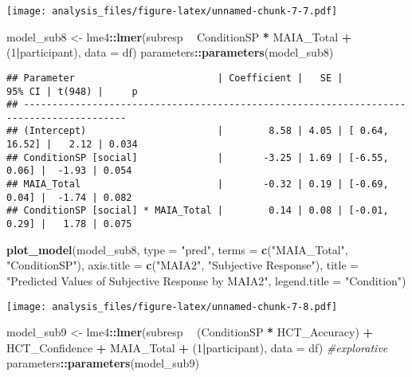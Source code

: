 \documentclass[
]{article}
\newenvironment{Shaded}{\begin{snugshade}}{\end{snugshade}}
\newcommand{\CommentTok}[1]{\textcolor[rgb]{0.56,0.35,0.01}{\textit{#1}}}
\newcommand{\DataTypeTok}[1]{\textcolor[rgb]{0.13,0.29,0.53}{#1}}
\newcommand{\DecValTok}[1]{\textcolor[rgb]{0.00,0.00,0.81}{#1}}
\newcommand{\KeywordTok}[1]{\textcolor[rgb]{0.13,0.29,0.53}{\textbf{#1}}}
\newcommand{\NormalTok}[1]{#1}
\newcommand{\OperatorTok}[1]{\textcolor[rgb]{0.81,0.36,0.00}{\textbf{#1}}}
\newcommand{\StringTok}[1]{\textcolor[rgb]{0.31,0.60,0.02}{#1}}
\begin{document}
\texttt{[image: analysis\_files/figure-latex/unnamed-chunk-7-7.pdf]}

\begin{Shaded}
\begin{Highlighting}[]
\NormalTok{model_sub8 <-}\StringTok{ }\NormalTok{lme4}\OperatorTok{::}\KeywordTok{lmer}\NormalTok{(subresp }\OperatorTok{~}\StringTok{ }\NormalTok{ConditionSP }\OperatorTok{*}\StringTok{ }\NormalTok{MAIA_Total }\OperatorTok{+}\StringTok{ }\NormalTok{(}\DecValTok{1}\OperatorTok{|}\NormalTok{participant), }\DataTypeTok{data =}\NormalTok{ df)}
\NormalTok{parameters}\OperatorTok{::}\KeywordTok{parameters}\NormalTok{(model_sub8)}
\end{Highlighting}
\end{Shaded}

\begin{verbatim}
## Parameter                         | Coefficient |   SE |         95% CI | t(948) |     p
## ----------------------------------------------------------------------------------------
## (Intercept)                       |        8.58 | 4.05 | [ 0.64, 16.52] |   2.12 | 0.034
## ConditionSP [social]              |       -3.25 | 1.69 | [-6.55,  0.06] |  -1.93 | 0.054
## MAIA_Total                        |       -0.32 | 0.19 | [-0.69,  0.04] |  -1.74 | 0.082
## ConditionSP [social] * MAIA_Total |        0.14 | 0.08 | [-0.01,  0.29] |   1.78 | 0.075
\end{verbatim}

\begin{Shaded}
\begin{Highlighting}[]
\KeywordTok{plot_model}\NormalTok{(model_sub8, }\DataTypeTok{type =} \StringTok{"pred"}\NormalTok{, }\DataTypeTok{terms =} \KeywordTok{c}\NormalTok{(}\StringTok{"MAIA_Total"}\NormalTok{, }\StringTok{"ConditionSP"}\NormalTok{), }\DataTypeTok{axis.title =} \KeywordTok{c}\NormalTok{(}\StringTok{"MAIA2"}\NormalTok{, }\StringTok{"Subjective Response"}\NormalTok{), }\DataTypeTok{title =} \StringTok{"Predicted Values of Subjective Response by MAIA2"}\NormalTok{, }\DataTypeTok{legend.title =} \StringTok{"Condition"}\NormalTok{)}
\end{Highlighting}
\end{Shaded}

\texttt{[image: analysis\_files/figure-latex/unnamed-chunk-7-8.pdf]}

\begin{Shaded}
\begin{Highlighting}[]
\NormalTok{model_sub9 <-}\StringTok{ }\NormalTok{lme4}\OperatorTok{::}\KeywordTok{lmer}\NormalTok{(subresp }\OperatorTok{~}\StringTok{ }\NormalTok{(ConditionSP }\OperatorTok{*}\StringTok{ }\NormalTok{HCT_Accuracy) }\OperatorTok{+}\StringTok{ }\NormalTok{HCT_Confidence }\OperatorTok{+}\StringTok{ }\NormalTok{MAIA_Total }\OperatorTok{+}\StringTok{ }\NormalTok{(}\DecValTok{1}\OperatorTok{|}\NormalTok{participant), }\DataTypeTok{data =}\NormalTok{ df)                                                                                       }\CommentTok{#explorative}
\NormalTok{parameters}\OperatorTok{::}\KeywordTok{parameters}\NormalTok{(model_sub9)}
\end{Highlighting}
\end{Shaded}
\end{document}
